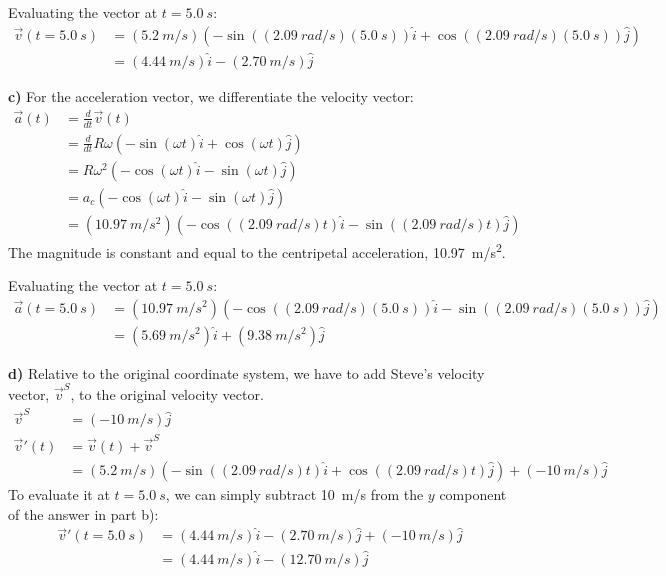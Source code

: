 \begin{solution}
Evaluating the vector at $t=\SI{5.0}{s}$:
\begin{align*}
\vec v(t=\SI{5.0}{s})&=(\SI{5.2}{m/s})\left(-\sin((\SI{2.09}{rad/s})(\SI{5.0}{s})) \hat i + \cos( (\SI{2.09}{rad/s}) (\SI{5.0}{s})) \hat j\right)\\
&=(\SI{4.44}{m/s})\hat i - (\SI{2.70}{m/s})\hat j
\end{align*}

\textbf{c)} For the acceleration vector, we differentiate the velocity vector:
\begin{align*}
\vec a(t) &=\frac{d}{dt}\vec v(t)\\
&=\frac{d}{dt}R\omega\left(-\sin(\omega t)\hat i + \cos(\omega t) \hat j\right) \\
&=R\omega^2\left(-\cos(\omega t)\hat i - \sin(\omega t) \hat j\right) \\
&=a_c\left(-\cos(\omega t)\hat i - \sin(\omega t) \hat j\right)\\
&=(\SI{10.97}{m/s^2})\left(-\cos((\SI{2.09}{rad/s})t) \hat i -\sin( (\SI{2.09}{rad/s}) t) \hat j\right)
\end{align*}
The magnitude is constant and equal to the centripetal acceleration, \SI{10.97}{m/s^2}.

Evaluating the vector at $t=\SI{5.0}{s}$:
\begin{align*}
\vec a(t=\SI{5.0}{s})&=(\SI{10.97}{m/s^2})\left(-\cos((\SI{2.09}{rad/s})(\SI{5.0}{s})) \hat i -\sin( (\SI{2.09}{rad/s}) (\SI{5.0}{s})) \hat j\right)\\
&=(\SI{5.69}{m/s^2})\hat i + (\SI{9.38}{m/s^2})\hat j
\end{align*}

\textbf{d)} Relative to the original coordinate system, we have to add Steve's velocity vector, $\vec v^S$, to the original velocity vector.
\begin{align*}
\vec v^S &= (\SI{-10}{m/s})\hat j\\
\vec v'(t) &= \vec v(t) + \vec v^S\\
&=(\SI{5.2}{m/s})\left(-\sin((\SI{2.09}{rad/s})t) \hat i + \cos( (\SI{2.09}{rad/s}) t) \hat j\right)+(\SI{-10}{m/s})\hat j
\end{align*}
To evaluate it at $t=\SI{5.0}{s}$, we can simply subtract \SI{10}{m/s} from the $y$ component of the answer in part b):
\begin{align*}
\vec v'(t=\SI{5.0}{s})&=(\SI{4.44}{m/s})\hat i - (\SI{2.70}{m/s})\hat j+(\SI{-10}{m/s})\hat j \\
&=(\SI{4.44}{m/s})\hat i - (\SI{12.70}{m/s})\hat j
\end{align*}

\end{solution}

